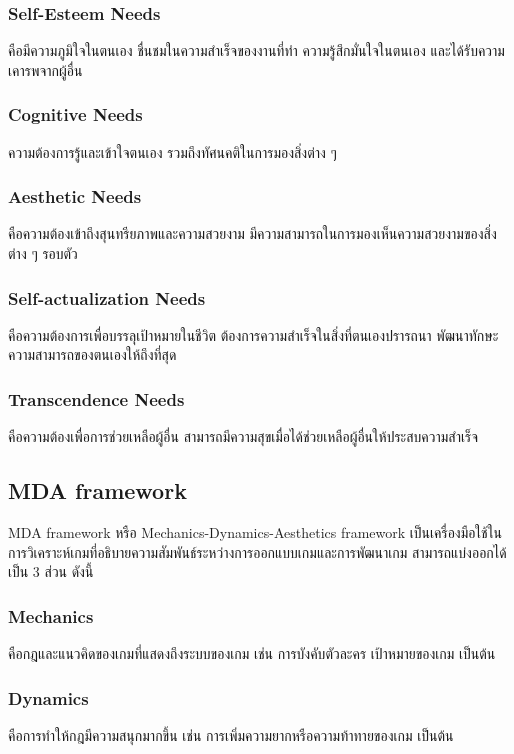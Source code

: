 \documentclass[12pt,oneside,openright,a4paper]{cpe-thai-project}
\begin{document}
\subsubsection{Self-Esteem Needs}
	คือมีความภูมิใจในตนเอง ชื่นชมในความสำเร็จของงานที่ทำ 
  ความรู้สึกมั่นใจในตนเอง และได้รับความเคารพจากผู้อื่น
\subsubsection{Cognitive Needs}
	ความต้องการรู้และเข้าใจตนเอง รวมถึงทัศนคติในการมองสิ่งต่าง ๆ
\subsubsection{Aesthetic Needs}
	คือความต้องเข้าถึงสุนทรียภาพและความสวยงาม 
  มีความสามารถในการมองเห็นความสวยงามของสิ่งต่าง ๆ รอบตัว
\subsubsection{Self-actualization Needs}
	คือความต้องการเพื่อบรรลุเป้าหมายในชีวิต ต้องการความสำเร็จในสิ่งที่ตนเองปรารถนา 
  พัฒนาทักษะความสามารถของตนเองให้ถึงที่สุด
\subsubsection{Transcendence Needs}
	คือความต้องเพื่อการช่วยเหลือผู้อื่น สามารถมีความสุขเมื่อได้ช่วยเหลือผู้อื่นให้ประสบความสำเร็จ

\pagebreak
\subsection{MDA framework}
MDA framework หรือ Mechanics-Dynamics-Aesthetics framework 
เป็นเครื่องมือใช้ในการวิเคราะห์เกมที่อธิบายความสัมพันธ์ระหว่างการออกแบบเกมและการพัฒนาเกม 
สามารถแบ่งออกได้เป็น 3 ส่วน ดังนี้ 

\subsubsection{Mechanics}
  คือกฎและแนวคิดของเกมที่แสดงถึงระบบของเกม เช่น การบังคับตัวละคร เป้าหมายของเกม เป็นต้น
\subsubsection{Dynamics}
  คือการทำให้กฎมีความสนุกมากขึ้น เช่น การเพิ่มความยากหรือความท้าทายของเกม เป็นต้น
\end{document}
